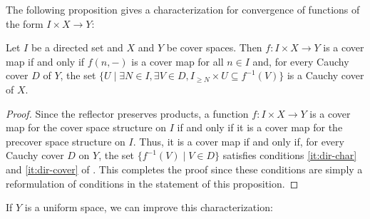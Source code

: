 \documentclass[reqno]{amsart}
\theoremstyle{definition}
\theoremstyle{remark}
\numberwithin{figure}{section}
\begin{document}
The following proposition gives a characterization for convergence of functions of the form $I \times X \to Y$:

\begin{prop}
Let $I$ be a directed set and $X$ and $Y$ be cover spaces.
Then $f : I \times X \to Y$ is a cover map if and only if $f(n,-)$ is a cover map for all $n \in I$ and, for every Cauchy cover $D$ of $Y$, the set $\{ U \mid \exists N \in I, \exists V \in D, I_{\geq N} \times U \subseteq f^{-1}(V) \}$ is a Cauchy cover of $X$.
\end{prop}
\begin{proof}
Since the reflector preserves products, a function $f : I \times X \to Y$ is a cover map for the cover space structure on $I$ if and only if it is a cover map for the precover space structure on $I$.
Thus, it is a cover map if and only if, for every Cauchy cover $D$ on $Y$, the set $\{ f^{-1}(V) \mid V \in D \}$ satisfies conditions \eqref{it:dir-char} and \eqref{it:dir-cover} of .
This completes the proof since these conditions are simply a reformulation of conditions in the statement of this proposition.
\end{proof}

If $Y$ is a uniform space, we can improve this characterization:
\end{document}
